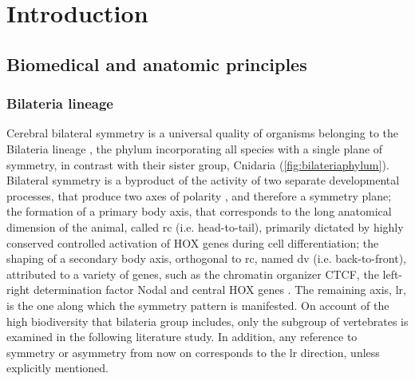 \chapter{Introduction}
\label{chap:introduction}
\section{Biomedical and anatomic principles}
\subsection{Bilateria lineage}
Cerebral bilateral symmetry is a universal quality of organisms belonging to the Bilateria lineage \cite{Concha2012,Corballis2009}, the phylum incorporating all species with a single plane of symmetry, in contrast with their sister group, Cnidaria (\autoref{fig:bilateriaphylum}). Bilateral symmetry is a byproduct of the activity of two separate developmental processes, that produce two axes of polarity \cite{Finnerty2003}, and therefore a symmetry plane; the formation of a primary body axis, that corresponds to the long anatomical dimension of the animal, called \acf{rc} (i.e. head-to-tail), primarily dictated by highly conserved controlled activation of HOX genes during cell differentiation; the shaping of a secondary body axis, orthogonal to \ac{rc}, named \acf{dv} (i.e. back-to-front), attributed to a variety of genes,  such as the chromatin organizer CTCF, the left-right determination factor Nodal and central HOX genes \cite{Heger2020}. The remaining axis, \acf{lr}, is the one along which the symmetry pattern is manifested. On account of the high biodiversity that bilateria group includes, only the subgroup of vertebrates is examined in the following literature study. In addition, any reference to symmetry or asymmetry from now on corresponds to the \ac{lr} direction, unless explicitly mentioned.

